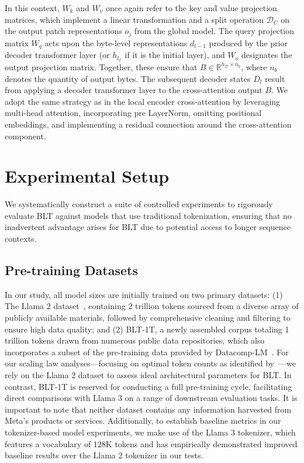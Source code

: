 In this context, $W_k$ and $W_v$ once again refer to the key and value projection matrices, which implement a linear transformation and a split operation $\mathcal{D}_C$ on the output patch representations $o_j$ from the global model. The query projection matrix $W_q$ acts upon the byte-level representations $d_{l-1}$ produced by the prior decoder transformer layer (or $h_{l_{\mathcal{E}}}$ if it is the initial layer), and $W_o$ designates the output projection matrix. Together, these ensure that $B \in \mathbb{R}^{h_{\mathcal{D}} \times n_b}$, where $n_b$ denotes the quantity of output bytes. The subsequent decoder states $D_l$ result from applying a decoder transformer layer to the cross-attention output $B$. We adopt the same strategy as in the local encoder cross-attention by leveraging multi-head attention, incorporating pre LayerNorm, omitting positional embeddings, and implementing a residual connection around the cross-attention component.

\section{Experimental Setup}
\label{section:experiments}
We systematically construct a suite of controlled experiments to rigorously evaluate {\textsc BLT} against models that use traditional tokenization, ensuring that no inadvertent advantage arises for {\textsc BLT} due to potential access to longer sequence contexts.

\subsection{Pre-training Datasets} In our study, all model sizes are initially trained on two primary datasets: (1) The Llama 2 dataset~\citep{touvron2023llama}, containing 2 trillion tokens sourced from a diverse array of publicly available materials, followed by comprehensive cleaning and filtering to ensure high data quality; and (2) {\textsc BLT}-1T, a newly assembled corpus totaling 1 trillion tokens drawn from numerous public data repositories, which also incorporates a subset of the pre-training data provided by Datacomp-LM~\citep{li2024datacomp}. For our scaling law analyses—focusing on optimal token counts as identified by~\cite{dubey2024llama}—we rely on the Llama 2 dataset to assess ideal architectural parameters for {\textsc BLT}. In contrast, {\textsc BLT}-1T is reserved for conducting a full pre-training cycle, facilitating direct comparisons with Llama 3 on a range of downstream evaluation tasks. It is important to note that neither dataset contains any information harvested from Meta’s products or services. Additionally, to establish baseline metrics in our tokenizer-based model experiments, we make use of the Llama 3 tokenizer, which features a vocabulary of 128K tokens and has empirically demonstrated improved baseline results over the Llama 2 tokenizer in our tests.

